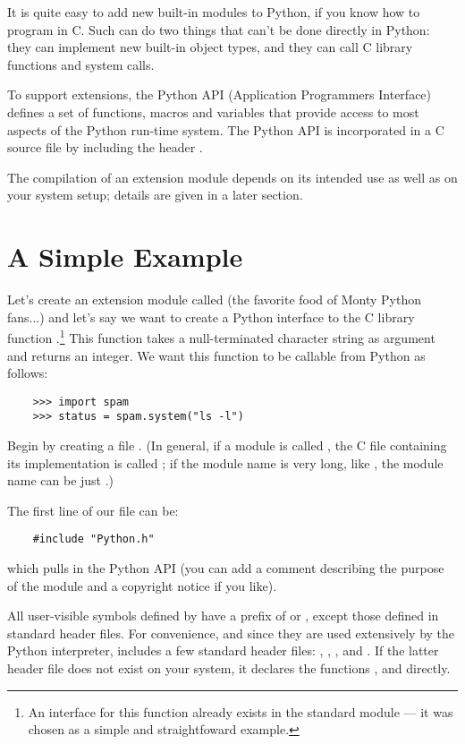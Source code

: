 It is quite easy to add new built-in modules to Python, if you know
how to program in C.  Such  can do two things
that can't be done directly in Python: they can implement new built-in
object types, and they can call C library functions and system calls.

To support extensions, the Python API (Application Programmers
Interface) defines a set of functions, macros and variables that
provide access to most aspects of the Python run-time system.  The
Python API is incorporated in a C source file by including the header
.

The compilation of an extension module depends on its intended use as
well as on your system setup; details are given in a later section.


\section{A Simple Example}

Let's create an extension module called  (the favorite food
of Monty Python fans...) and let's say we want to create a Python
interface to the C library function .\footnote{An
interface for this function already exists in the standard module
 --- it was chosen as a simple and straightfoward example.}
This function takes a null-terminated character string as argument and
returns an integer.  We want this function to be callable from Python
as follows:

\begin{verbatim}
    >>> import spam
    >>> status = spam.system("ls -l")
\end{verbatim}

Begin by creating a file .  (In general, if a
module is called , the C file containing its implementation
is called ; if the module name is very long, like
, the module name can be just .)

The first line of our file can be:

\begin{verbatim}
    #include "Python.h"
\end{verbatim}

which pulls in the Python API (you can add a comment describing the
purpose of the module and a copyright notice if you like).

All user-visible symbols defined by  have a prefix of
 or , except those defined in standard header files.
For convenience, and since they are used extensively by the Python
interpreter,  includes a few standard header files:
, , , and
.  If the latter header file does not exist on your
system, it declares the functions ,  and
 directly.


